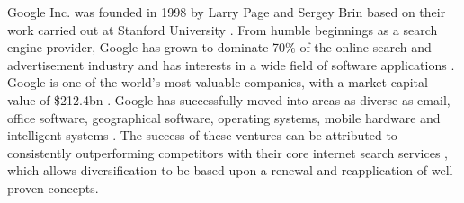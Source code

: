 
Google Inc. was founded in 1998 \cite{google:timeline} by Larry Page and Sergey Brin based on their work carried out at Stanford University \cite{brin1998anatomy}. From humble beginnings as a search engine provider, Google has grown to dominate 70\% of the online search and advertisement industry \cite{rothrmel2013strategic} and has interests in a wide field of software applications \cite{wheelen2012strategic}. Google is one of the world's most valuable companies, with a market capital value of \$212.4bn \cite{FT500}. Google has successfully moved into areas as diverse as email, office software, geographical software, operating systems, mobile hardware and intelligent systems \cite{rothrmel2013strategic, wheelen2012strategic}. The success of these ventures can be attributed to consistently outperforming competitors with their core internet search services \cite{wheelen2012strategic}, which allows diversification to be based upon a renewal and reapplication of well-proven concepts.



